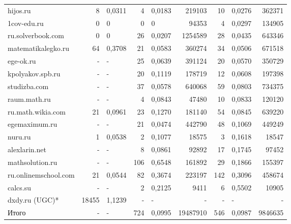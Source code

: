 {\begin{landscape}
\begin{tabular}{|l|r|l|r|l|r|r|l|r|}
hijos.ru             &     8  & 0,0311 &   4  & 0,0183 &   219103  &   10  &  0,0276  &   362371  \\
1cov-edu.ru          &     0  & 0      &   0  & 0      &    94353  &    4  &  0,0297  &   134905  \\
ru.solverbook.com    &     0  & 0      &  26  & 0,0207 &  1254589  &   28  &  0,0435  &   643346  \\
matematikalegko.ru   &    64  & 0,3708 &  21  & 0,0583 &   360274  &   34  &  0,0506  &   671518  \\
ege-ok.ru            &     -  & -      &  25  & 0,0639 &   391124  &   20  &  0,0570  &   350729  \\
kpolyakov.spb.ru     &     -  & -      &  20  & 0,1119 &   178719  &   12  &  0,0608  &   197398  \\
studizba.com         &     -  & -      &  37  & 0,0578 &   640068  &   59  &  0,0803  &   734375  \\
raum.math.ru         &     -  & -      &   4  & 0,0843 &    47480  &   10  &  0,0833  &   120120  \\
ru.math.wikia.com    &    21  & 0,0961 &  23  & 0,1270 &   181140  &   54  &  0,0845  &   639220  \\
egemaximum.ru        &     -  & -      &  21  & 0,0474 &   442790  &   48  &  0,1069  &   449249  \\
nuru.ru              &     1  & 0,0538 &   2  & 0,1077 &    18575  &    3  &  0,1618  &    18547  \\
alexlarin.net        &     -  & -      &   8  & 0,0861 &    92892  &   17  &  0,1745  &    97452  \\
mathsolution.ru      &     -  & -      & 106  & 0,6548 &   161892  &   29  &  0,1866  &   155397  \\
ru.onlinemschool.com &    21  & 0,0544 &  82  & 0,3674 &   223197  &  142  &  0,3096  &   458674  \\
calcs.su             &     -  & -      &   2  & 0,2125 &     9411  &    6  &  0,5502  &    10905  \\
dxdy.ru (UGC)*       & 18455  & 1,1239 &   -  & -      &        -  &    -  &  -       &        -  \\
\hline
Итого                &     -  & -      & 724  & 0,0995 & 19487910  &  546  &  0,0987  &  9846635  \\
\hline
\end{tabular}
\end{landscape}
}

\litlist

